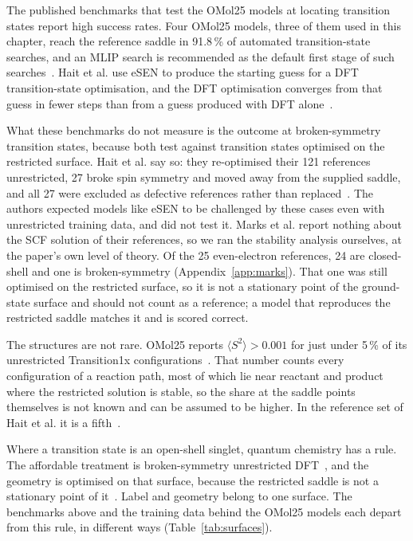 The published benchmarks that test the OMol25 models at locating
transition states report high success rates. Four OMol25 models, three
of them used in this chapter, reach the reference saddle in 91.8\,\% of
automated transition-state searches, and an MLIP search is recommended
as the default first stage of such searches~\cite{marks2026}. Hait et
al. use eSEN to produce the starting guess for a DFT transition-state
optimisation, and the DFT optimisation converges from that guess in
fewer steps than from a guess produced with DFT alone~\cite{hait2025}.

What these benchmarks do not measure is the outcome at broken-symmetry
transition states, because both test against transition states
optimised on the restricted surface. Hait et al. say so: they
re-optimised their 121 references unrestricted, 27 broke spin symmetry
and moved away from the supplied saddle, and all 27 were excluded as
defective references rather than replaced~\cite{hait2025}. The authors
expected models like eSEN to be challenged by these cases even with
unrestricted training data, and did not test it. Marks et al. report
nothing about the SCF solution of their references, so we ran the
stability analysis ourselves, at the paper's own level of theory. Of
the 25 even-electron references, 24 are closed-shell and one is
broken-symmetry (Appendix~\ref{app:marks}). That one was still
optimised on the restricted surface, so it is not a stationary point
of the ground-state surface and should not count as a reference; a
model that reproduces the restricted saddle matches it and is scored
correct.

The structures are not rare. OMol25 reports $\langle S^2 \rangle >
0.001$ for just under 5\,\% of its unrestricted Transition1x
configurations~\cite{omol25}. That number counts every configuration of
a reaction path, most of which lie near reactant and product where the
restricted solution is stable, so the share at the saddle points
themselves is not known and can be assumed to be higher. In the
reference set of Hait et al. it is a fifth~\cite{hait2025}.

Where a transition state is an open-shell singlet, quantum chemistry
has a rule. The affordable treatment is broken-symmetry unrestricted
DFT~\cite{grafenstein2002}, and the geometry is optimised on that
surface, because the restricted saddle is not a stationary point of
it~\cite{crawford2001}. Label and geometry belong to one surface. The
benchmarks above and the training data behind the OMol25 models each
depart from this rule, in different ways (Table~\ref{tab:surfaces}).

